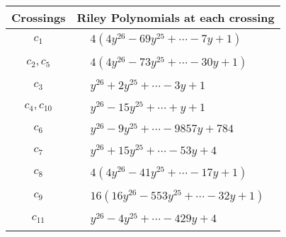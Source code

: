 \documentclass[1p]{elsarticle_modified}
\theoremstyle{definition}
\begin{document}
\begin{tabular}{m{50pt}|m{274pt}}
Crossings & \hspace{64pt}Riley Polynomials at each crossing \\
\hline $$\begin{aligned}c_{1}\end{aligned}$$&$\begin{aligned}
&4(4 y^{26}-69 y^{25}+\cdots-7 y+1)
\end{aligned}$\\
\hline $$\begin{aligned}c_{2},c_{5}\end{aligned}$$&$\begin{aligned}
&4(4 y^{26}-73 y^{25}+\cdots-30 y+1)
\end{aligned}$\\
\hline $$\begin{aligned}c_{3}\end{aligned}$$&$\begin{aligned}
&y^{26}+2 y^{25}+\cdots-3 y+1
\end{aligned}$\\
\hline $$\begin{aligned}c_{4},c_{10}\end{aligned}$$&$\begin{aligned}
&y^{26}-15 y^{25}+\cdots+y+1
\end{aligned}$\\
\hline $$\begin{aligned}c_{6}\end{aligned}$$&$\begin{aligned}
&y^{26}-9 y^{25}+\cdots-9857 y+784
\end{aligned}$\\
\hline $$\begin{aligned}c_{7}\end{aligned}$$&$\begin{aligned}
&y^{26}+15 y^{25}+\cdots-53 y+4
\end{aligned}$\\
\hline $$\begin{aligned}c_{8}\end{aligned}$$&$\begin{aligned}
&4(4 y^{26}-41 y^{25}+\cdots-17 y+1)
\end{aligned}$\\
\hline $$\begin{aligned}c_{9}\end{aligned}$$&$\begin{aligned}
&16(16 y^{26}-553 y^{25}+\cdots-32 y+1)
\end{aligned}$\\
\hline $$\begin{aligned}c_{11}\end{aligned}$$&$\begin{aligned}
&y^{26}-4 y^{25}+\cdots-429 y+4
\end{aligned}$\\
\hline
\end{tabular}\\~\\
\end{document}
